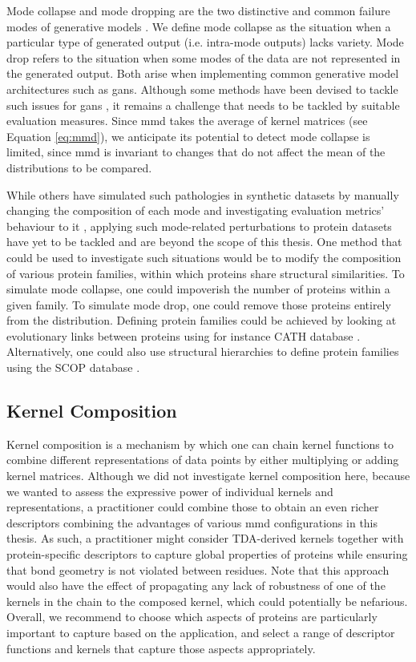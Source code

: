 Mode collapse and mode dropping are the two distinctive and common failure modes
of generative models \citep{salimans2016improved}. We define mode collapse as
the situation when a particular type of generated output (i.e. intra-mode
outputs) lacks variety. Mode drop refers to the situation when some modes of the
data are not represented in the generated output. Both arise when implementing
common generative model architectures such as \acrshort{gans}. Although some
methods have been devised to tackle such issues for \acrshort{gans}
\citep{arjovsky2017wasserstein, goodfellow2014generative}, it remains a
challenge that needs to be tackled by suitable evaluation measures. Since
\acrshort{mmd} takes the average of kernel matrices (see Equation \ref{eq:mmd}),
we anticipate its potential to detect mode collapse is limited, since
\acrshort{mmd} is invariant to changes that do not affect the mean of the
distributions to be compared.

While others have simulated such pathologies in synthetic datasets by manually
changing the composition of each mode and investigating evaluation metrics'
behaviour to it \citep{thompson2022evaluation}, applying such mode-related
perturbations to protein datasets have yet to be tackled and are beyond the
scope of this thesis. One method that could be used to investigate such
situations would be to modify the composition of various protein families,
within which proteins share structural similarities. To simulate mode collapse,
one could impoverish the number of proteins within a given family. To simulate
mode drop, one could remove those proteins entirely from the distribution.
Defining protein families could be achieved by looking at evolutionary links
between proteins using for instance CATH database \citep{orengo1997cath}.
Alternatively, one could also use structural hierarchies to define protein
families using the SCOP database \citep{murzin1995scop}.

\subsection{Kernel Composition}

Kernel composition is a mechanism by which one can chain kernel functions to
combine different representations of data points by either multiplying or adding
kernel matrices. Although we did not investigate kernel composition here,
because we wanted to assess the expressive power of individual kernels and
representations, a practitioner could combine those to obtain an even richer
descriptors combining the advantages of various \acrshort{mmd} configurations in this
thesis. As such, a practitioner might consider TDA-derived kernels together with
protein-specific descriptors to capture global properties of proteins while
ensuring that bond geometry is not violated between residues. Note that this
approach would also have the effect of propagating any lack of robustness of one
of the kernels in the chain to the composed kernel, which could potentially be
nefarious. Overall, we recommend to choose which aspects of proteins are
particularly important to capture based on the application, and select a range
of descriptor functions and kernels that capture those aspects appropriately.

